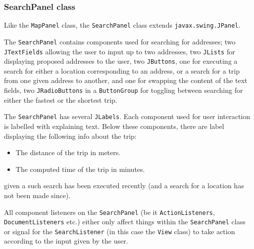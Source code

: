 \subsubsection{SearchPanel class}
Like the \texttt{MapPanel} class, the \texttt{SearchPanel} class extends \texttt{javax.swing.JPanel}.

The \texttt{SearchPanel} contains components used for searching for addresses; two \texttt{JTextFields} allowing the user to input up to two addresses, two \texttt{JLists} for displaying proposed addresses to the user, two \texttt{JButtons}, one for executing a search for either a location corresponding to an address, or a search for a trip from one given address to another, and one for swapping the content of the text fields, two \texttt{JRadioButtons} in a \texttt{ButtonGroup} for toggling between searching for either the fastest or the shortest trip.

The \texttt{SearchPanel} has several \texttt{JLabels}. Each component used for user interaction is labelled with explaining text. Below these components, there are label displaying the following info about the trip:
\begin{itemize}
 \item The distance of the trip in meters.
 \item The computed time of the trip in minutes.
\end{itemize}
given a such search has been executed recently (and a search for a location has not been made since).

All component listeners on the \texttt{SearchPanel} (be it \texttt{ActionListeners}, \texttt{DocumentListeners} etc.) either only affect things within the \texttt{SearchPanel} class or signal for the \texttt{SearchListener} (in this case the \texttt{View} class) to take action according to the input given by the user.

